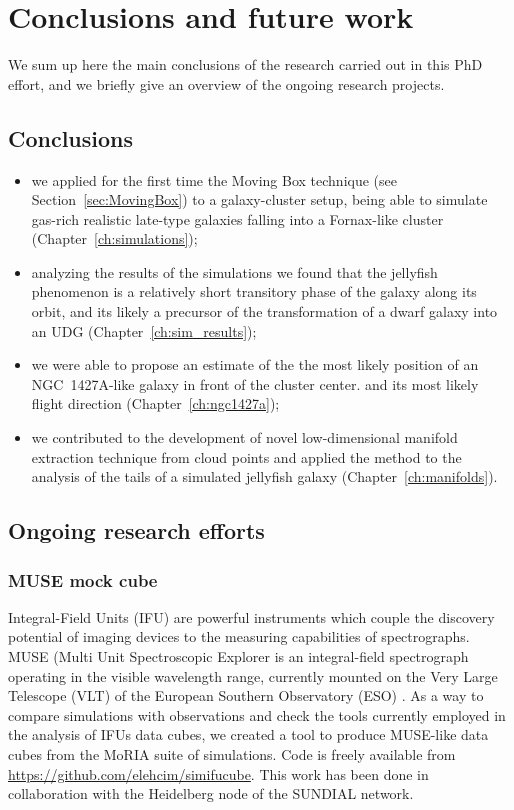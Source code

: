 
\chapter{Conclusions and future work}
\label{ch:conclusions}
We sum up here the main conclusions of the research carried out in this PhD effort, and we briefly give an overview of the ongoing research projects.\\[5ex]


\section{Conclusions}

\begin{itemize}
  \item we applied for the first time the Moving Box technique (see Section~\ref{sec:MovingBox}) to a galaxy-cluster setup, being able to simulate gas-rich realistic late-type galaxies falling into a Fornax-like cluster (Chapter~\ref{ch:simulations});
  \item analyzing the results of the simulations we found that the jellyfish phenomenon is a relatively short transitory phase of the galaxy along its orbit, and its likely a precursor of the transformation of a dwarf galaxy into an UDG (Chapter~\ref{ch:sim_results});
  \item we were able to propose an estimate of the the most likely position of an NGC~1427A-like galaxy in front of the cluster center. and its most likely flight direction (Chapter~\ref{ch:ngc1427a});
  \item we contributed to the development of novel low-dimensional manifold extraction technique from cloud points and applied the method to the analysis of the tails of a simulated jellyfish galaxy (Chapter~\ref{ch:manifolds}).
\end{itemize}

\section{Ongoing research efforts}
\subsection{MUSE mock cube}
Integral-Field Units (IFU) are powerful instruments which couple the discovery potential of imaging devices to the measuring capabilities of spectrographs.
MUSE (Multi Unit Spectroscopic Explorer is an integral-field spectrograph operating in the visible wavelength range, currently mounted on the Very Large Telescope (VLT) of the European Southern Observatory (ESO) \citep{Bacon2010, MUSEWebpage}.
As a way to compare simulations with observations and check the tools currently employed in the analysis of IFUs data cubes, we created a tool to produce MUSE-like data cubes from the MoRIA suite of simulations.
Code is freely available from \url{https://github.com/elehcim/simifucube}.
This work has been done in collaboration with the Heidelberg node of the SUNDIAL network.

